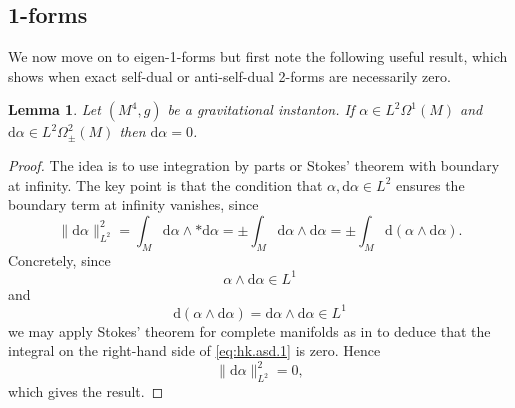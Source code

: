 \documentclass{article}
\newtheorem{lem}[thm]{Lemma}
\theoremstyle{definition}
\numberwithin{thm}{section}
\numberwithin{equation}{section}
\DeclareMathOperator\Vol{Vol}
\def\d{\mathrm{d}}
\begin{document}
\subsection{1-forms}

We now move on to eigen-1-forms but first note the following useful result, which shows when exact self-dual or anti-self-dual 2-forms are necessarily zero.

\begin{lem}\label{lem:hk.asd.exact}  Let $(M^4,g)$ be a gravitational instanton.  
If $\alpha\in L^2\Omega^1(M)$ and $\d\alpha\in L^2\Omega^2_{\pm}(M)$ then $\d\alpha=0$.
\end{lem}

\begin{proof}
The idea is to   use integration by parts or Stokes' theorem with boundary at infinity.  The key point is that the condition that $\alpha,\d\alpha\in L^2$ ensures the boundary term at infinity vanishes, since 
\begin{equation}\label{eq:hk.asd.1}
    \|\d\alpha\|_{L^2}^2=\int_M\d\alpha\wedge *\d\alpha=\pm\int_M\d\alpha\wedge\d\alpha=\pm\int_M\d(\alpha\wedge\d\alpha).
\end{equation}
Concretely, since \begin{equation}
\alpha\wedge\d\alpha\in L^1\end{equation} and 
\begin{equation}
\d(\alpha\wedge\d\alpha)=\d\alpha\wedge\d\alpha\in L^1
\end{equation}we may apply Stokes' theorem for complete manifolds as in \cite{Gaffney} to deduce that the integral on the right-hand side of \eqref{eq:hk.asd.1} is zero.  Hence
\begin{equation}
    \|\d\alpha\|_{L^2}^2=0,
\end{equation}
which gives the result.
%
\end{proof}
\end{document}
